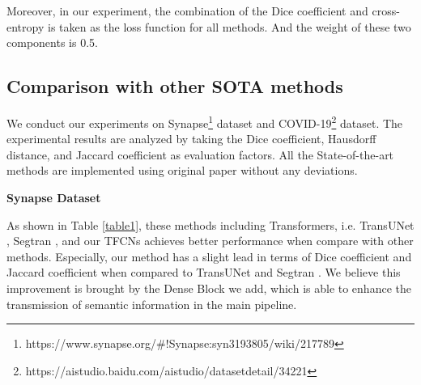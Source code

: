 \documentclass[runningheads]{llncs}
\begin{document}
Moreover, in our experiment, the combination of the Dice coefficient and cross-entropy is taken as the loss function for all methods. And the weight of these two components is 0.5.

\subsection{Comparison with other SOTA methods}
\label{sec4.2}

We conduct our experiments on Synapse\footnote{https://www.synapse.org/\#!Synapse:syn3193805/wiki/217789} dataset and COVID-19\footnote{https://aistudio.baidu.com/aistudio/datasetdetail/34221} dataset. The experimental results are analyzed by taking the Dice coefficient, Hausdorff distance, and Jaccard coefficient as evaluation factors. All the State-of-the-art methods are implemented using original paper without any deviations.


\noindent\textbf{Synapse Dataset}\par

As shown in Table \ref{table1}, these methods including Transformers, i.e. TransUNet \cite{chen2021transunet}, Segtran \cite{zheng2021rethinking}, and our TFCNs achieves better performance when compare with other methods. Especially, our method has a slight lead in terms of Dice coefficient and Jaccard coefficient when compared to TransUNet \cite{chen2021transunet} and Segtran \cite{zheng2021rethinking}. We believe this improvement is brought by the Dense Block we add, which is able to enhance the transmission of semantic information in the main pipeline.
\end{document}
